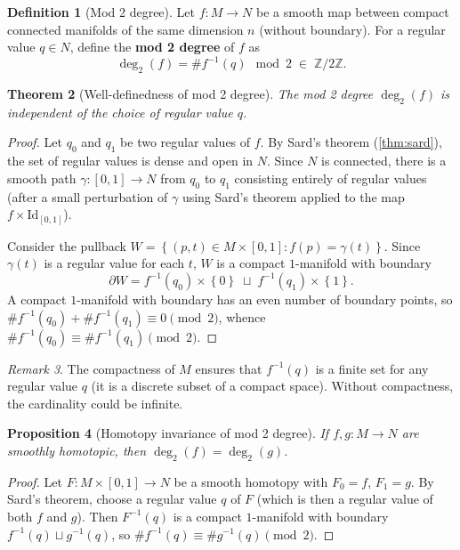 \documentclass[12pt,a4paper,openany]{book}
\newtheorem{theorem}{Theorem}[section]
\newtheorem{proposition}[theorem]{Proposition}
\theoremstyle{definition}
\newtheorem{definition}[theorem]{Definition}
\theoremstyle{remark}
\newtheorem{remark}[theorem]{Remark}
\newcommand{\Z}{\mathbb{Z}}
\newcommand{\Id}{\mathrm{Id}}
\newcommand{\set}[1]{\left\{ #1 \right\}}
\begin{document}
\begin{definition}[Mod 2 degree]\label{def:mod2-degree}
Let $f\colon M \to N$ be a smooth map between compact connected manifolds
of the same dimension $n$ (without boundary). For a regular value
$q \in N$, define the \textbf{mod 2 degree} of $f$ as
\[
  \deg_2(f) = \#f^{-1}(q) \mod 2 \;\in\; \Z/2\Z.
\]
\end{definition}

\begin{theorem}[Well-definedness of mod 2 degree]\label{thm:mod2-welldefined}
The mod 2 degree $\deg_2(f)$ is independent of the choice of regular
value $q$.
\end{theorem}

\begin{proof}
Let $q_0$ and $q_1$ be two regular values of $f$. By Sard's theorem
(\autoref{thm:sard}), the set of regular values is dense and open in $N$.
Since $N$ is connected, there is a smooth path $\gamma\colon [0,1]\to N$
from $q_0$ to $q_1$ consisting entirely of regular values (after a small
perturbation of $\gamma$ using Sard's theorem applied to the map
$f \times \Id_{[0,1]}$).

Consider the pullback $W = \set{(p,t)\in M\times[0,1] : f(p) = \gamma(t)}$.
Since $\gamma(t)$ is a regular value for each $t$, $W$ is a compact
$1$-manifold with boundary
\[
  \partial W = f^{-1}(q_0)\times\set{0} \;\sqcup\; f^{-1}(q_1)\times\set{1}.
\]
A compact $1$-manifold with boundary has an even number of boundary points,
so $\#f^{-1}(q_0) + \#f^{-1}(q_1) \equiv 0 \pmod{2}$, whence
$\#f^{-1}(q_0) \equiv \#f^{-1}(q_1) \pmod{2}$.
\end{proof}

\begin{remark}\label{rem:mod2-compact}
The compactness of $M$ ensures that $f^{-1}(q)$ is a finite set for
any regular value $q$ (it is a discrete subset of a compact space).
Without compactness, the cardinality could be infinite.
\end{remark}

\begin{proposition}[Homotopy invariance of mod 2 degree]\label{prop:mod2-homotopy}
If $f,g\colon M \to N$ are smoothly homotopic, then $\deg_2(f) = \deg_2(g)$.
\end{proposition}

\begin{proof}
Let $F\colon M \times [0,1] \to N$ be a smooth homotopy with $F_0 = f$,
$F_1 = g$. By Sard's theorem, choose a regular value $q$ of $F$ (which
is then a regular value of both $f$ and $g$). Then $F^{-1}(q)$ is a compact
$1$-manifold with boundary $f^{-1}(q)\sqcup g^{-1}(q)$, so
$\#f^{-1}(q) \equiv \#g^{-1}(q) \pmod{2}$.
\end{proof}
\end{document}
